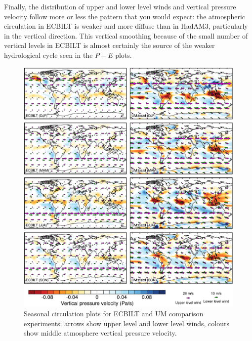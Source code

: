 \documentclass[a4paper,11pt,article]{article}
\begin{document}
Finally, the distribution of upper and lower level winds and vertical
pressure velocity follow more or less the pattern that you would
expect: the atmospheric circulation in ECBILT is weaker and more
diffuse than in HadAM3, particularly in the vertical direction.  This
vertical smoothing because of the small number of vertical levels in
ECBILT is almost certainly the source of the weaker hydrological cycle
seen in the $P-E$ plots.

\begin{figure}
  \begin{center}
    \includegraphics[width=\textwidth]{control-expt-1/wind-plots}
  \end{center}
  \caption{Seasonal circulation plots for ECBILT and UM comparison
    experiments: arrows show upper level and lower level winds,
    colours show middle atmosphere vertical pressure velocity.}
  \label{fig:wind}
\end{figure}
\end{document}
